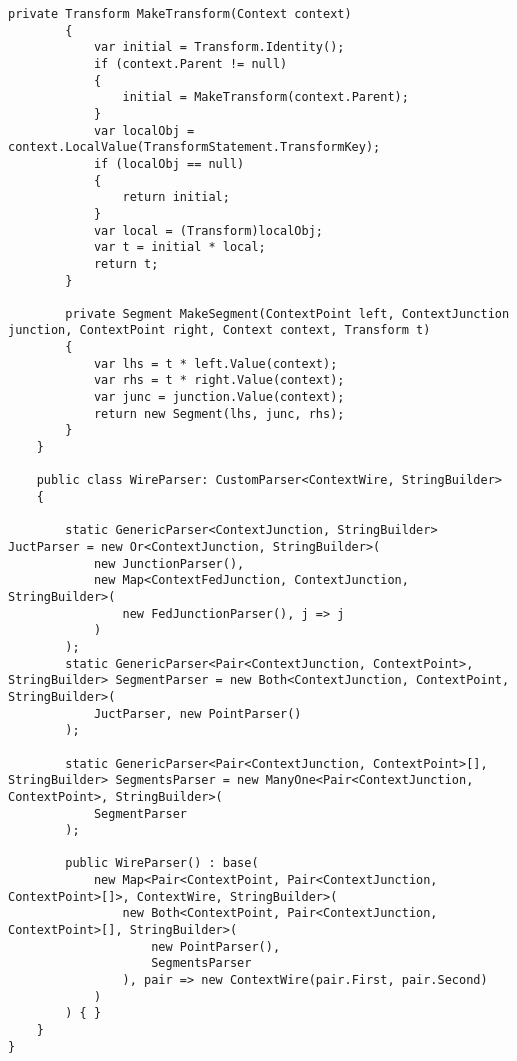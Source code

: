 \documentclass{scrartcl}
\begin{document}
\begin{lstlisting}[language={[Sharp]C}, caption={Wire}, label={experiment}]
        private Transform MakeTransform(Context context)
        {
            var initial = Transform.Identity();
            if (context.Parent != null)
            {
                initial = MakeTransform(context.Parent);
            }
            var localObj = context.LocalValue(TransformStatement.TransformKey);
            if (localObj == null)
            {
                return initial;
            }
            var local = (Transform)localObj;
            var t = initial * local;
            return t;
        }

        private Segment MakeSegment(ContextPoint left, ContextJunction junction, ContextPoint right, Context context, Transform t)
        {
            var lhs = t * left.Value(context);
            var rhs = t * right.Value(context);
            var junc = junction.Value(context);
            return new Segment(lhs, junc, rhs);
        }
    }

    public class WireParser: CustomParser<ContextWire, StringBuilder>
    {

        static GenericParser<ContextJunction, StringBuilder> JuctParser = new Or<ContextJunction, StringBuilder>(
            new JunctionParser(),
            new Map<ContextFedJunction, ContextJunction, StringBuilder>(
                new FedJunctionParser(), j => j
            )
        );
        static GenericParser<Pair<ContextJunction, ContextPoint>, StringBuilder> SegmentParser = new Both<ContextJunction, ContextPoint, StringBuilder>(
            JuctParser, new PointParser()
        );

        static GenericParser<Pair<ContextJunction, ContextPoint>[], StringBuilder> SegmentsParser = new ManyOne<Pair<ContextJunction, ContextPoint>, StringBuilder>(
            SegmentParser
        );

        public WireParser() : base(
            new Map<Pair<ContextPoint, Pair<ContextJunction, ContextPoint>[]>, ContextWire, StringBuilder>(
                new Both<ContextPoint, Pair<ContextJunction, ContextPoint>[], StringBuilder>(
                    new PointParser(),
                    SegmentsParser
                ), pair => new ContextWire(pair.First, pair.Second)
            )
        ) { }
    }
}

\end{lstlisting}
\end{document}

